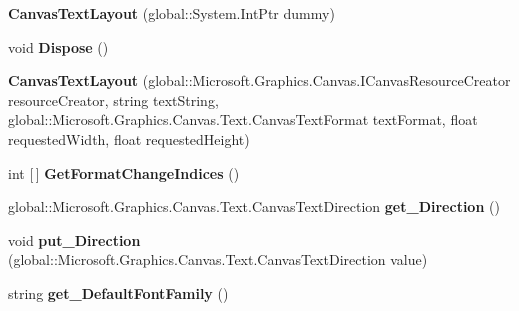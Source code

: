 \begin{DoxyCompactItemize}
{\bfseries Canvas\+Text\+Layout} (global\+::\+System.\+Int\+Ptr dummy)
\item 
\mbox{\label{class_microsoft_1_1_graphics_1_1_canvas_1_1_text_1_1_canvas_text_layout_a7d35b539c782a63cef76d60d771100b9}} 
void {\bfseries Dispose} ()
\item 
\mbox{\label{class_microsoft_1_1_graphics_1_1_canvas_1_1_text_1_1_canvas_text_layout_a3e6e6ee905c4e104025e259714b4f387}} 
{\bfseries Canvas\+Text\+Layout} (global\+::\+Microsoft.\+Graphics.\+Canvas.\+I\+Canvas\+Resource\+Creator resource\+Creator, string text\+String, global\+::\+Microsoft.\+Graphics.\+Canvas.\+Text.\+Canvas\+Text\+Format text\+Format, float requested\+Width, float requested\+Height)
\item 
\mbox{\label{class_microsoft_1_1_graphics_1_1_canvas_1_1_text_1_1_canvas_text_layout_a3a21e6cfe852ee1c03c9ae0f65349cbe}} 
int \mbox{[}$\,$\mbox{]} {\bfseries Get\+Format\+Change\+Indices} ()
\item 
\mbox{\label{class_microsoft_1_1_graphics_1_1_canvas_1_1_text_1_1_canvas_text_layout_acf787c5c52efb0a761fd5fa779c0b7a6}} 
global\+::\+Microsoft.\+Graphics.\+Canvas.\+Text.\+Canvas\+Text\+Direction {\bfseries get\+\_\+\+Direction} ()
\item 
\mbox{\label{class_microsoft_1_1_graphics_1_1_canvas_1_1_text_1_1_canvas_text_layout_a73aa648a92dd6826fcda1869c17dd35d}} 
void {\bfseries put\+\_\+\+Direction} (global\+::\+Microsoft.\+Graphics.\+Canvas.\+Text.\+Canvas\+Text\+Direction value)
\item 
\mbox{\label{class_microsoft_1_1_graphics_1_1_canvas_1_1_text_1_1_canvas_text_layout_a3b9b032aa706d4c64f518de16b2fb53d}} 
string {\bfseries get\+\_\+\+Default\+Font\+Family} ()
\item 
\mbox{\label{class_microsoft_1_1_graphics_1_1_canvas_1_1_text_1_1_canvas_text_layout_a7b61d023318daba6edb2a2a6e8d53fa4}} 

\end{DoxyCompactItemize}
